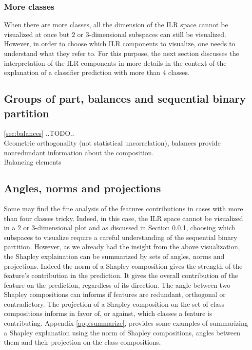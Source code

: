 \documentclass{article}
\theoremstyle{plain}
\theoremstyle{definition}
\theoremstyle{remark}
\begin{document}
\subsubsection{More classes}
\label{sec:moreclasses}
When there are more classes, all the dimension of the ILR space cannot be visualized at once but $2$ or $3$-dimensional subspaces can still be visualized. However, in order to choose which ILR components to visualize, one needs to understand what they refer to. For this purpose, the next section discusses the interpretation of the ILR components in more details in the context of the explanation of a classifier prediction with more than 4 classes.

\subsection{Groups of part, balances and sequential binary partition}
\ref{sec:balances}
..TODO..\\
Geometric orthogonality (not statistical uncorrelation), balances provide nonredundant information about the composition.\\
Balancing elements\\
\cite{egozcue2005groups}

\subsection{Angles, norms and projections}

Some may find the fine analysis of the features contributions in cases with more than four classes tricky. Indeed, in this case, the ILR space cannot be visualized in a $2$ or $3$-dimensional plot and as discussed in Section \ref{sec:moreclasses}, choosing which subspaces to visualize require a careful understanding of the sequential binary partition. However, as we already had the insight from the above visualization, the Shapley explaination can be summarized by sets of angles, norms and projections. Indeed the norm of a Shapley composition gives the strength of the feature's contribution in the prediction. It gives the overall contribution of the feature on the prediction, regardless of its direction. The angle between two Shapley compositions can informs if features are redundant, orthogonal or contradictory. The projection of a Shapley composition on the set of class-compositions informs in favor of, or against, which classes a feature is contributing. Appendix \ref{app:summarize}, provides some examples of summarizing a Shapley explanation using the norm of Shapley compositions, angles between them and their projection on the class-compositions.
\end{document}
